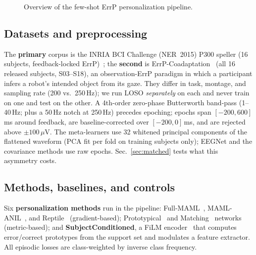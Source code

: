 \documentclass[conference,a4paper]{IEEEtran}
\begin{document}
\begin{figure}[t]
\centering
{}
\caption{Overview of the few-shot ErrP personalization pipeline.}
\label{fig:pipeline}
\end{figure}

\subsection{Datasets and preprocessing}
The \textbf{primary} corpus is the INRIA BCI Challenge (NER~2015) P300 speller (16
subjects, feedback-locked ErrP)~\cite{perrin2012objective}; the \textbf{second} is
ErrP-Coadaptation~\cite{ehrlich2018human} (all 16 released subjects, S03--S18), an
observation-ErrP paradigm in which a participant infers a robot's intended object
from its gaze. They differ in task, montage, and sampling rate (200 vs.\ 250\,Hz);
we run LOSO \emph{separately} on each and never train on one and test on the other.
A 4th-order zero-phase Butterworth band-pass (1--40\,Hz; plus a 50\,Hz notch at
250\,Hz) precedes epoching; epochs span $[-200,600]$\,ms around feedback, are
baseline-corrected over $[-200,0]$\,ms, and are rejected above $\pm100\,\mu$V. The
meta-learners use 32 whitened principal components of the flattened waveform (PCA fit
per fold on training subjects only); EEGNet and the covariance methods use raw epochs.
Sec.~\ref{sec:matched} tests what this asymmetry costs.

\subsection{Methods, baselines, and controls}
Six \textbf{personalization methods} run in the pipeline: Full-MAML~\cite{finn2017model},
MAML-ANIL~\cite{raghu2020rapid}, and Reptile~\cite{nichol2018first} (gradient-based);
Prototypical~\cite{snell2017prototypical} and Matching~\cite{vinyals2016matching}
networks (metric-based); and \textbf{SubjectConditioned}, a FiLM
encoder~\cite{perez2018film} that computes error/correct prototypes from the support
set and modulates a feature extractor. All episodic losses are class-weighted by
inverse class frequency.
\end{document}
